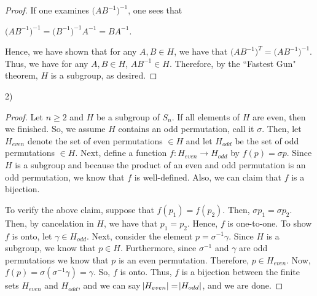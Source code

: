 \documentclass[executivepaper]{article}
\begin{document}
\begin{flushleft}
\begin{center}
\begin{proof}
If one examines $\Big(AB^{-1}\Big)^{-1}$, one sees that 

\begin{center}

$\Big(AB^{-1}\Big)^{-1}=\Big(B^{-1}\Big)^{-1} A^{-1}=BA^{-1}$.

\end{center}

Hence, we have shown that for any $A,B \in H$, we have that $\Big(AB^{-1}\Big)^{T}=\Big(AB^{-1}\Big)^{-1}$. Thus, we have for any $A,B \in H$, $AB^{-1} \in H$. Therefore, by the ``Fastest Gun" theorem, $H$ is a subgroup, as desired.

\end{proof}

\end{center}

\end{flushleft}

\begin{flushleft}

2)

\begin{center}

\begin{proof}
Let $n \geq 2$ and $H$ be a subgroup of $S_{n}$. If all elements of $H$ are even, then we finished. So, we assume $H$ contains an odd permutation, call it $\sigma$. Then, let $H_{even}$ denote the set of even permutations $\in H$ and let $H_{odd}$ be the set of odd permutations $\in H$. Next, define a function $f: H_{even} \rightarrow H_{odd}$ by $f(p)=\sigma p$. Since $H$ is a subgroup and because the product of an even and odd permutation is an odd permutation, we know that $f$ is well-defined. Also, we can claim that $f$ is a bijection.

\vspace{2mm}

To verify the above claim, suppose that $f(p_{1})=f(p_{2})$. Then, $\sigma p_{1}=\sigma p_{2}$. Then, by cancelation in $H$, we have that $p_{1}=p_{2}$. Hence, $f$ is one-to-one. To show $f$ is onto, let $\gamma \in H_{odd}$. Next, consider the element $p=\sigma^{-1} \gamma$. Since $H$ is a subgroup, we know that $p \in H$. Furthermore, since $\sigma^{-1}$ and $\gamma$ are odd permutations \pagebreak \vspace*{-40mm} we know that $p$ is an even permutation. Therefore, $p \in H_{even}$. Now, $f(p)=\sigma (\sigma^{-1} \gamma)=\gamma$. So, $f$ is onto. Thus, $f$ is a bijection between the finite sets $H_{even}$ and $H_{odd}$, and we can say $\abs{H_{even}}=\abs{H_{odd}}$, and we are done.

\end{proof}

\end{center} 

\end{flushleft}
\end{document}
